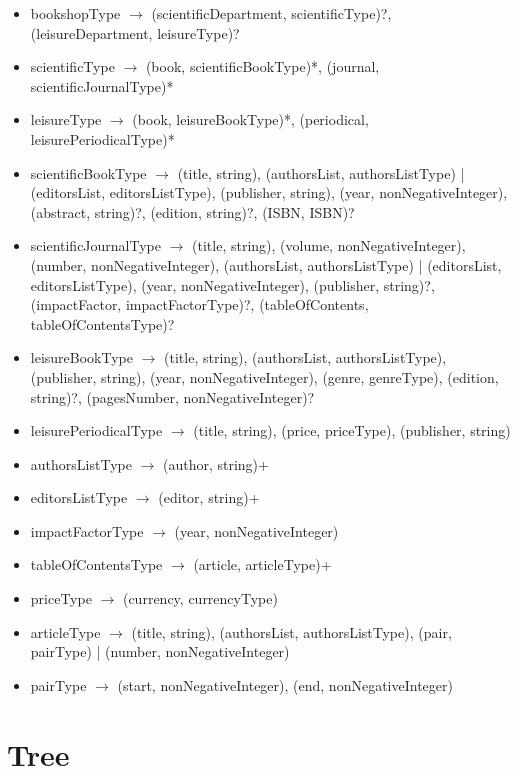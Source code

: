 \documentclass{article}
\begin{document}
\begin{itemize}
    \item bookshopType $\to$ (scientificDepartment, scientificType)?, (leisureDepartment, leisureType)?

    \item scientificType $\to$ (book, scientificBookType)*, (journal, scientificJournalType)*
    \item leisureType $\to$ (book, leisureBookType)*, (periodical, leisurePeriodicalType)*

    \item scientificBookType $\to$ (title, string), (authorsList, authorsListType) | (editorsList, editorsListType), (publisher, string), (year, nonNegativeInteger), (abstract, string)?, (edition, string)?, (ISBN, ISBN)?
    \item scientificJournalType $\to$ (title, string), (volume, nonNegativeInteger), (number, nonNegativeInteger), (authorsList, authorsListType) | (editorsList, editorsListType), (year, nonNegativeInteger), (publisher, string)?, (impactFactor, impactFactorType)?, (tableOfContents, tableOfContentsType)?
    \item leisureBookType $\to$ (title, string), (authorsList, authorsListType), (publisher, string), (year, nonNegativeInteger), (genre, genreType), (edition, string)?, (pagesNumber, nonNegativeInteger)?
    \item leisurePeriodicalType $\to$ (title, string), (price, priceType), (publisher, string)

    \item authorsListType $\to$ (author, string)+
    \item editorsListType $\to$ (editor, string)+
    \item impactFactorType $\to$ (year, nonNegativeInteger)
    \item tableOfContentsType $\to$ (article, articleType)+
    \item priceType $\to$ (currency, currencyType)

    \item articleType $\to$ (title, string), (authorsList, authorsListType), (pair, pairType) | (number, nonNegativeInteger)

    \item pairType $\to$ (start, nonNegativeInteger), (end, nonNegativeInteger)

\end{itemize}


\section{Tree}
\end{document}
